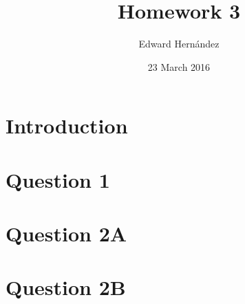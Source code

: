 \documentclass[man,12pt]{apa6}
\begin{document}
\title{Homework 3}
\author{Edward Hern\'{a}ndez}
\date{23 March 2016}
\maketitle

\section{Introduction}


\section{Question 1}


\section{Question 2A}


\section{Question 2B}

\end{document}
